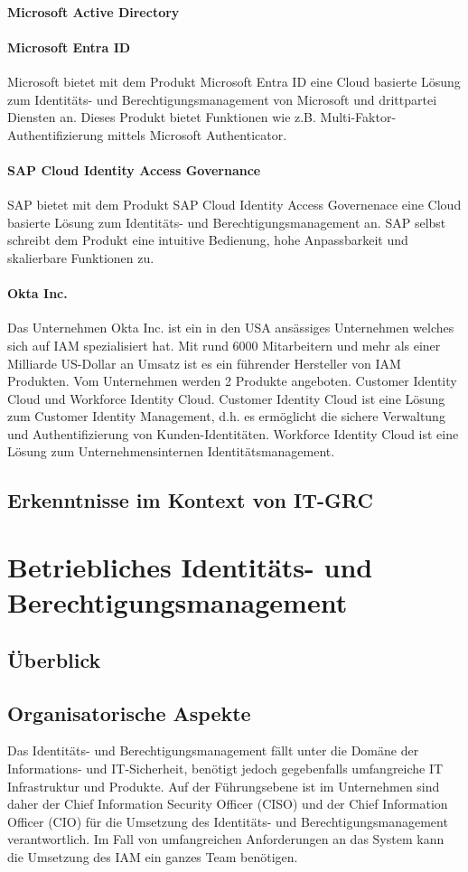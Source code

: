 \documentclass[10pt]{article}
\begin{document}
\paragraph{Microsoft Active Directory}
\paragraph{Microsoft Entra ID}
Microsoft bietet mit dem Produkt \glqq{}Microsoft Entra ID\grqq{} eine Cloud basierte Lösung zum Identitäts- und Berechtigungsmanagement von Microsoft und drittpartei Diensten an. Dieses Produkt bietet Funktionen wie z.B. Multi-Faktor-Authentifizierung mittels Microsoft Authenticator.
\paragraph{SAP Cloud Identity Access Governance}
SAP bietet mit dem Produkt \glqq{}SAP Cloud Identity Access Governenace\grqq{} eine Cloud basierte Lösung zum Identitäts- und Berechtigungsmanagement an. SAP selbst schreibt dem Produkt eine intuitive Bedienung, hohe Anpassbarkeit und skalierbare Funktionen zu.
\paragraph{Okta Inc.}
Das Unternehmen Okta Inc. ist ein in den USA ansässiges Unternehmen welches sich auf IAM spezialisiert hat. Mit rund 6000 Mitarbeitern und mehr als einer Milliarde US-Dollar an Umsatz ist es ein führender Hersteller von IAM Produkten. Vom Unternehmen werden 2 Produkte angeboten. Customer Identity Cloud und Workforce Identity Cloud. Customer Identity Cloud ist eine Lösung zum Customer Identity Management, d.h. es ermöglicht die sichere Verwaltung und Authentifizierung von Kunden-Identitäten. Workforce Identity Cloud ist eine Lösung zum Unternehmensinternen Identitätsmanagement.
\subsection{Erkenntnisse im Kontext von IT-GRC}
\section{Betriebliches Identitäts- und Berechtigungsmanagement}
\label{sec:betrieb}
\subsection{Überblick}
\subsection{Organisatorische Aspekte}
Das Identitäts- und Berechtigungsmanagement fällt unter die Domäne der Informations- und IT-Sicherheit, benötigt jedoch gegebenfalls umfangreiche IT Infrastruktur und Produkte. Auf der Führungsebene ist im Unternehmen sind daher der Chief Information Security Officer (CISO) und der Chief Information Officer (CIO) für die Umsetzung des Identitäts- und Berechtigungsmanagement verantwortlich. Im Fall von umfangreichen Anforderungen an das System kann die Umsetzung des IAM ein ganzes Team benötigen.
\end{document}
